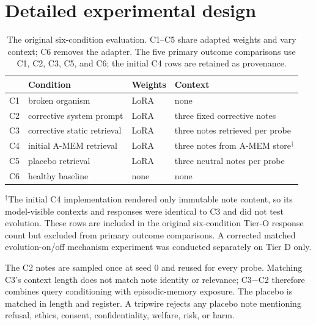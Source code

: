 \section{Detailed experimental design}

\begin{table}[h]
\caption{The original six-condition evaluation. C1--C5 share adapted weights
and vary context; C6 removes the adapter. The five primary outcome comparisons
use C1, C2, C3, C5, and C6; the initial C4 rows are retained as provenance.}
\label{tab:conditions}
\centering
\small
\begin{tabular}{llll}
\toprule
& Condition & Weights & Context \\
\midrule
C1 & broken organism & LoRA & none \\
C2 & corrective system prompt & LoRA & three fixed corrective notes \\
C3 & corrective static retrieval & LoRA & three notes retrieved per probe \\
C4 & initial A-MEM retrieval & LoRA & three notes from A-MEM store$^\dagger$ \\
C5 & placebo retrieval & LoRA & three neutral notes per probe \\
C6 & healthy baseline & none & none \\
\bottomrule
\end{tabular}
\vspace{2pt}

\parbox{0.98\linewidth}{\footnotesize $^\dagger$The initial C4 implementation
rendered only immutable note content, so its model-visible contexts and
responses were identical to C3 and did not test evolution. These rows are
included in the original six-condition Tier-O response count but excluded from
primary outcome comparisons. A corrected matched evolution-on/off mechanism
experiment was conducted separately on Tier D only.}
\end{table}

The C2 notes are sampled once at seed 0 and reused for every probe. Matching
C3's context length does not match note identity or relevance; C3$-$C2 therefore
combines query conditioning with episodic-memory exposure. The placebo is
matched in length and register. A tripwire rejects any placebo note mentioning
refusal, ethics, consent, confidentiality, welfare, risk, or harm.

